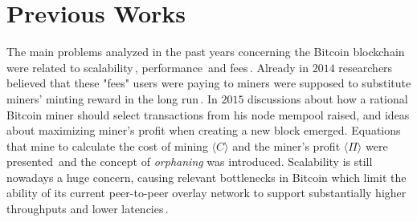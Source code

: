 \documentclass[USenglish]{uit-thesis}
\begin{document}
\section{Previous Works}
\label{sec:relatedworks}
The main problems analyzed in the past years
concerning the Bitcoin blockchain were related
to scalability\,\cite{Rizun:2015:blocksizelimit, croman2016},
performance\,\cite{croman2016, Decker2013IPBN} and
fees\,\cite{Rizun:2015:blocksizelimit, Moser2015}.
Already in $2014$ researchers believed that
these "fees" users were paying to miners
were supposed to substitute miners' minting
reward in the long run\,\cite{Moser2015}.
In $2015$ discussions about how a rational
Bitcoin miner should select transactions from
his node mempool raised, and ideas about
maximizing miner's profit when creating a new block
emerged. Equations that mine to calculate the
cost of mining $\langle C \rangle$
and the miner's profit $\langle \Pi \rangle$ were
presented\,\cite{Rizun:2015:blocksizelimit} and
the concept of \emph{orphaning} was introduced.
Scalability is still nowadays a huge concern,
causing relevant bottlenecks in Bitcoin which
limit the ability of its current peer-to-peer
overlay network to support substantially higher
throughputs and lower latencies\,\cite{croman2016}.
\end{document}
